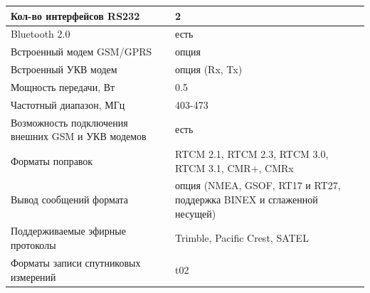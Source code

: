 \documentclass[a4paper]{article}
\begin{document}
\begin{newpage}
\begin{center}
\begin{tabular}{ | p{200pt} | p{260pt} | }
            \hline
            Кол-во интерфейсов RS232 & 2\\
            \hline
            Bluetooth 2.0 & есть\\
            \hline
            Встроенный модем GSM/GPRS & опция\\
            \hline
            Встроенный УКВ модем  & опция (Rx, Tx)\\
            \hline
            Мощность передачи, Вт & 0.5\\
            \hline
            Частотный диапазон, МГц & 403-473\\
            \hline
            Возможность подключения внешних GSM и УКВ модемов & есть\\
            \hline
            Форматы поправок & RTCM 2.1, RTCM 2.3, RTCM 3.0, RTCM 3.1, CMR+, CMRx\\
            \hline
            Вывод сообщений формата & опция (NMEA, GSOF, RT17 и RT27,  поддержка BINEX и сглаженной несущей)\\
            \hline
            Поддерживаемые эфирные протоколы & Trimble, Pacific Crest, SATEL\\
            \hline
            Форматы записи спутниковых измерений & t02\\
            \hline
        \end{tabular}
    \end{center}
    
\end{newpage}
\end{document}
